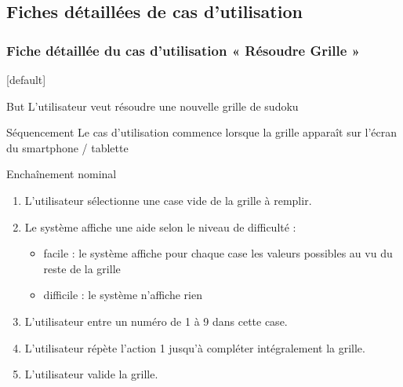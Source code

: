 \documentclass{beamer}
\begin{document}
\subsection{Fiches détaillées de cas d’utilisation}
\begin{frame}
  \frametitle{Fiche détaillée du cas d'utilisation « Résoudre Grille »}
  [default]
  \begin{block}{\footnotesize{But}}
\scriptsize{L'utilisateur veut résoudre une nouvelle grille de sudoku}
  \end{block}
  \pause
  \begin{block}{\footnotesize{Séquencement}}
\scriptsize{Le cas d'utilisation commence lorsque la grille apparaît sur l'écran du
    smartphone / tablette}
  \end{block}
  \pause
  \begin{block}{\footnotesize{Enchaînement nominal}}
    \begin{enumerate}    
      [circle]
    \item
      \scriptsize{L'utilisateur sélectionne une case vide de la grille à remplir.}
    \item
      \scriptsize{Le système affiche une aide selon le niveau de difficulté :}
      \begin{itemize}
        [circle]
      \item
        \scriptsize{facile : le système affiche pour chaque case les valeurs possibles au vu du
        reste de la grille}
      \item
        \scriptsize{difficile : le système n'affiche rien}
      \end{itemize}
    \item
      \scriptsize{L'utilisateur entre un numéro de 1 à 9 dans cette case.}
    \item
      \scriptsize{L'utilisateur répète l'action 1 jusqu'à compléter intégralement la grille.}
    \item
      \scriptsize{L'utilisateur valide la grille.}
    \end{enumerate}
  \end{block}
\end{frame}
\end{document}
